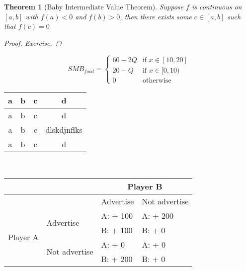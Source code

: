 \documentclass{book}
\newtheorem{theorem}{Theorem}[section]
\begin{document}
\begin{theorem}[Baby Intermediate Value Theorem]
Suppose $f$ is continuous on $[a,b]$ with $f(a)<0$ and $f(b)>0$, then there exists some $c \in [a,b]$ such that $f(c) = 0$
\begin{proof}
Exercise.
\end{proof}
\begin{equation*}
SMB_{food}=
    \begin{cases}
        60 - 2Q & \text{if } x \in [10, 20]\\
        20 - Q & \text{if } x \in [0, 10)\\
        0 & \text{otherwise}
    \end{cases}
\end{equation*}
\end{theorem}
\begin{center}
\begin{tabular}{|c|c|c|c|}
    \hline
    a &b&c&d  \\\hline
    a &b&c&d  \\\hline
    a &b&c&dlskdjnflks  \\\hline
    a &b&c&d  \\\hline
\end{tabular}
\\
\begin{center}
\begin{tabular}{|m{2cm}|m{2cm}|m{2cm}|m{3cm}|}
\hline
& & \multicolumn{2}{|c|}{Player B} \\\hline
& & Advertise & Not advertise \\\hline
\multirow{4}{4em}{Player A} & \multirow{2}{4em}{Advertise} & A: + 100 & A: + 200\\
& & B: + 100 & B: + 0\\\hline
& \multirow{2}{4em}{Not advertise} & A: + 0 & A: + 0\\
& & B: + 200 & B: + 0\\\hline
\end{tabular}
\end{center}
\end{center}
\end{document}
